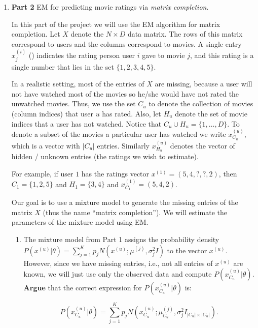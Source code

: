 \begin{enumerate}
\begin{enumerate}
\end{enumerate}

\item {\bf Part 2} EM for predicting movie ratings via \emph{matrix completion}.

In this part of the project we will use the EM algorithm for matrix completion. Let $X$ denote the $N \times D$ data matrix. The rows of this matrix correspond to users and the columns correspond to movies. A single entry $x^{(i)}_{j}$ () indicates the rating person user $i$ gave to movie $j$, and this rating is a single number that lies in the set $\{1,2,3,4,5\}$. 

In a realistic setting, most of the entries of $X$ are missing, because a user will not have watched most of the movies so he/she would have not rated the unwatched movies. Thus, we use the set $C_{u}$ to denote the collection of movies (column indices) that user $u$ has rated. Also, let $H_{u}$ denote the set of movie indices that a user has not watched. Notice that $C_{u} \cup H_{u} = \{1,\ldots,D\}$. To denote a subset of the movies a particular user has watched we write $x_{C_u}^{(u)}$, which is a vector with $|C_u|$ entries. Similarly $x_{H_u}^{(u)}$ denotes the vector of hidden / unknown entries (the ratings we wish to estimate).

For example, if user $1$ has the ratings vector $x^{(1)} =  (5, 4, ?, ?, 2)$, then $C_{1} = \{1, 2, 5\}$ and $H_{1} = \{ 3, 4\}$ and $x^{(1)}_{C_1} = (5, 4, 2)$.

Our goal is to use a mixture model to generate the missing entries of the matrix $X$ (thus the name ``matrix completion''). We will estimate the parameters of the mixture model using EM.

\begin{enumerate}
\item The mixture model from Part 1 assigns the probability density $P(x^{(u)} | \theta) = \sum^{K}_{j=1} p_j N(x^{(u)}; \mu^{(j)}, \sigma^2_j I)$ to the vector $x^{(u)}$. However, since we have missing entries, i.e., not all entries of $x^{(u)}$ are known, we will just use only the observed data and compute $P(x^{(u)}_{C_u} | \theta)$. \textbf{Argue} that the correct expression for $P(x^{(u)}_{C_u}  | \theta)$ is:

 $$P(x^{(u)}_{C_u}  | \theta) = \sum^{K}_{j=1} p_j N(x^{(u)}_{C_u} ; \mu^{(j)}_{C_u} , \sigma^2_j I_{|C_u| \times |C_u|}).$$ 
 

\end{enumerate}
\end{enumerate}
